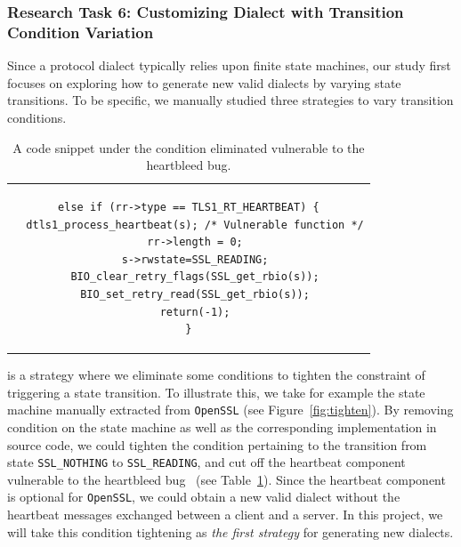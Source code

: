 {{\subsubsection{Research Task 6: Customizing Dialect with Transition Condition Variation}


Since a protocol dialect typically relies upon finite state machines, our study first focuses on exploring how to generate new valid dialects by varying state transitions. To be specific, we manually studied three strategies to vary transition conditions. 


\begin{table}
\centering
\begin{tabular}{c}
\hspace{12pt}

\begin{lstlisting}  
else if (rr->type == TLS1_RT_HEARTBEAT) {
  dtls1_process_heartbeat(s); /* Vulnerable function */
  rr->length = 0;
  s->rwstate=SSL_READING;
  BIO_clear_retry_flags(SSL_get_rbio(s));
  BIO_set_retry_read(SSL_get_rbio(s));
  return(-1);
}
\end{lstlisting}

\end{tabular}
\caption{A code snippet under the condition eliminated vulnerable to the heartbleed bug.}
\label{code:heartbleed}
\end{table} 

 is a strategy where we eliminate some conditions to tighten the constraint of triggering a state transition. To illustrate this, we take for example the state machine manually extracted from \texttt{OpenSSL} (see Figure~\ref{fig:tighten}). By removing condition  on the state machine as well as the corresponding implementation in source code, we could tighten the condition pertaining to the transition from state \texttt{SSL\_NOTHING} to \texttt{SSL\_READING}, and cut off the heartbeat component vulnerable to the heartbleed bug~\citep{} (see Table~\ref{code:heartbleed}). Since the heartbeat component is optional for \texttt{OpenSSL}, we could obtain a new valid dialect without the heartbeat messages exchanged between a client and a server. In this project, we will take this condition tightening as \emph{the first strategy} for generating new dialects. 

}}
